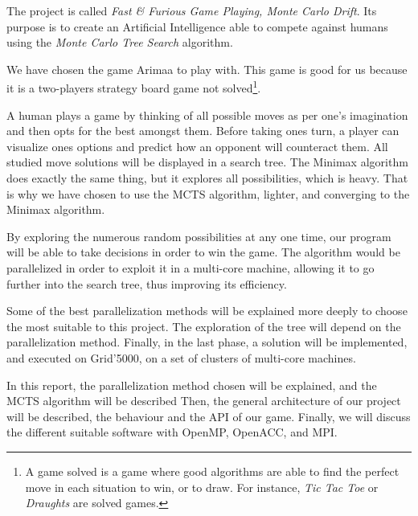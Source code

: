 The project is called \emph{Fast \& Furious Game Playing, Monte Carlo Drift}. Its purpose is to create an Artificial Intelligence able to compete against humans using the \emph{Monte Carlo Tree Search} algorithm.

We have chosen the game Arimaa to play with. This game is good for us because it is a two-players strategy board game not solved\footnote{A game solved is a game where good algorithms are able to find the perfect move in each situation to win, or to draw. For instance, \textit{Tic Tac Toe} or \textit{Draughts} are solved games.}.

A human plays a game by thinking of all possible moves as per one's imagination and then opts for the best amongst them. Before taking ones turn, a player can visualize ones options and predict how an opponent will counteract them. All studied move solutions will be displayed in a search tree. The Minimax algorithm does exactly the same thing, but it explores all possibilities, which is heavy. That is why we have chosen to use the MCTS algorithm, lighter, and converging to the Minimax algorithm.

By exploring the numerous random possibilities at any one time, our program will be able to take decisions in order to win the game.
The algorithm would be parallelized in order to exploit it in a multi-core machine, allowing it to go further into the search tree, thus improving its efficiency.

Some of the best parallelization methods will be explained more deeply to choose the most suitable to this project.
The exploration of the tree will depend on the parallelization method.
Finally, in the last phase, a solution will be implemented, and executed on Grid'5000, on a set of clusters of multi-core machines.


In this report, the parallelization method chosen will be explained, and the MCTS algorithm will be described
Then, the general architecture of our project will be described, the behaviour and the API of our game.
Finally, we will discuss the different suitable software with OpenMP, OpenACC, and MPI.

